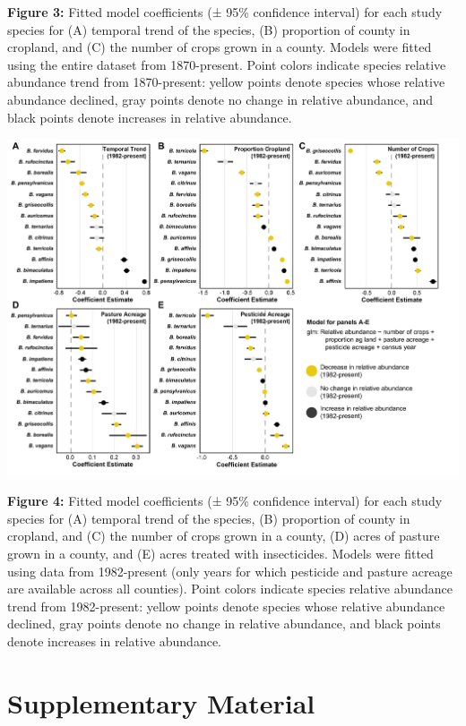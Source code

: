 \documentclass[11pt,]{article}
\begin{document}
\textbf{Figure 3:} Fitted model coefficients (± 95\% confidence
interval) for each study species for (A) temporal trend of the species,
(B) proportion of county in cropland, and (C) the number of crops grown
in a county. Models were fitted using the entire dataset from
1870-present. Point colors indicate species relative abundance trend
from 1870-present: yellow points denote species whose relative abundance
declined, gray points denote no change in relative abundance, and black
points denote increases in relative abundance.

\clearpage

\newpage

\includegraphics[width=1\textwidth,height=\textheight]{../ms_figs/fig5.png}

\textbf{Figure 4:} Fitted model coefficients (± 95\% confidence
interval) for each study species for (A) temporal trend of the species,
(B) proportion of county in cropland, and (C) the number of crops grown
in a county, (D) acres of pasture grown in a county, and (E) acres
treated with insecticides. Models were fitted using data from
1982-present (only years for which pesticide and pasture acreage are
available across all counties). Point colors indicate species relative
abundance trend from 1982-present: yellow points denote species whose
relative abundance declined, gray points denote no change in relative
abundance, and black points denote increases in relative abundance.

\clearpage

\newpage

\hypertarget{supplementary-material}{%
\section{Supplementary Material}\label{supplementary-material}}
\end{document}
